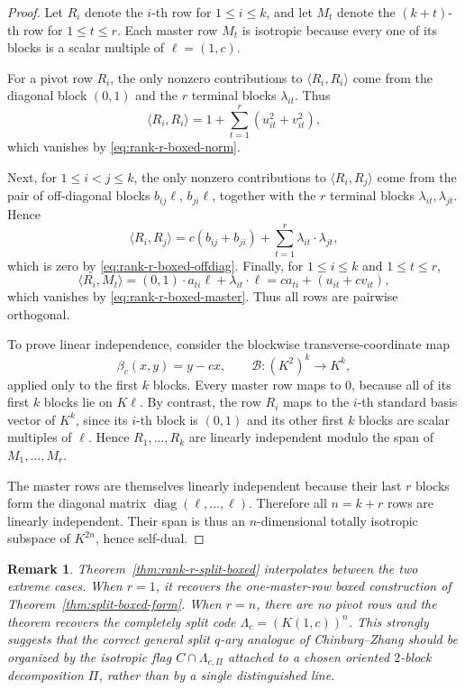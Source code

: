 \documentclass[12pt]{article}
\newtheorem{remark}[theorem]{Remark}
\begin{document}
\begin{proof}
Let \(R_i\) denote the \(i\)-th row for \(1\le i\le k\), and let \(M_t\) denote the \((k+t)\)-th row for \(1\le t\le r\). Each master row \(M_t\) is isotropic because every one of its blocks is a scalar multiple of \(\ell=(1,c)\).

For a pivot row \(R_i\), the only nonzero contributions to \(\langle R_i,R_i\rangle\) come from the diagonal block \((0,1)\) and the \(r\) terminal blocks \(\lambda_{it}\). Thus
\[
\langle R_i,R_i\rangle
=
1+\sum_{t=1}^r (u_{it}^2+v_{it}^2),
\]
which vanishes by \eqref{eq:rank-r-boxed-norm}.

Next, for \(1\le i<j\le k\), the only nonzero contributions to \(\langle R_i,R_j\rangle\) come from the pair of off-diagonal blocks \(b_{ij}\ell\), \(b_{ji}\ell\), together with the \(r\) terminal blocks \(\lambda_{it},\lambda_{jt}\). Hence
\[
\langle R_i,R_j\rangle
=
c(b_{ij}+b_{ji})+\sum_{t=1}^r \lambda_{it}\cdot\lambda_{jt},
\]
which is zero by \eqref{eq:rank-r-boxed-offdiag}. Finally, for \(1\le i\le k\) and \(1\le t\le r\),
\[
\langle R_i,M_t\rangle
=(0,1)\cdot a_{ti}\ell+\lambda_{it}\cdot \ell
=
ca_{ti}+(u_{it}+cv_{it}),
\]
which vanishes by \eqref{eq:rank-r-boxed-master}. Thus all rows are pairwise orthogonal.

To prove linear independence, consider the blockwise transverse-coordinate map
\[
\beta_c(x,y)=y-cx,
\qquad
\mathcal B:(K^{2})^k\to K^k,
\]
applied only to the first \(k\) blocks. Every master row maps to \(0\), because all of its first \(k\) blocks lie on \(K\ell\). By contrast, the row \(R_i\) maps to the \(i\)-th standard basis vector of \(K^k\), since its \(i\)-th block is \((0,1)\) and its other first \(k\) blocks are scalar multiples of \(\ell\). Hence \(R_1,\dots,R_k\) are linearly independent modulo the span of \(M_1,\dots,M_r\).

The master rows are themselves linearly independent because their last \(r\) blocks form the diagonal matrix \(\operatorname{diag}(\ell,\dots,\ell)\). Therefore all \(n=k+r\) rows are linearly independent. Their span is thus an \(n\)-dimensional totally isotropic subspace of \(K^{2n}\), hence self-dual.
\end{proof}

\begin{remark}
\rm
Theorem~\ref{thm:rank-r-split-boxed} interpolates between the two extreme cases. When \(r=1\), it recovers the one-master-row boxed construction of Theorem~\ref{thm:split-boxed-form}. When \(r=n\), there are no pivot rows and the theorem recovers the completely split code \(\Lambda_c=(K(1,c))^n\). This strongly suggests that the correct general split \(q\)-ary analogue of Chinburg--Zhang should be organized by the isotropic flag \(C\cap \Lambda_{c,\Pi}\) attached to a chosen oriented \(2\)-block decomposition \(\Pi\), rather than by a single distinguished line.
\end{remark}
\end{document}
